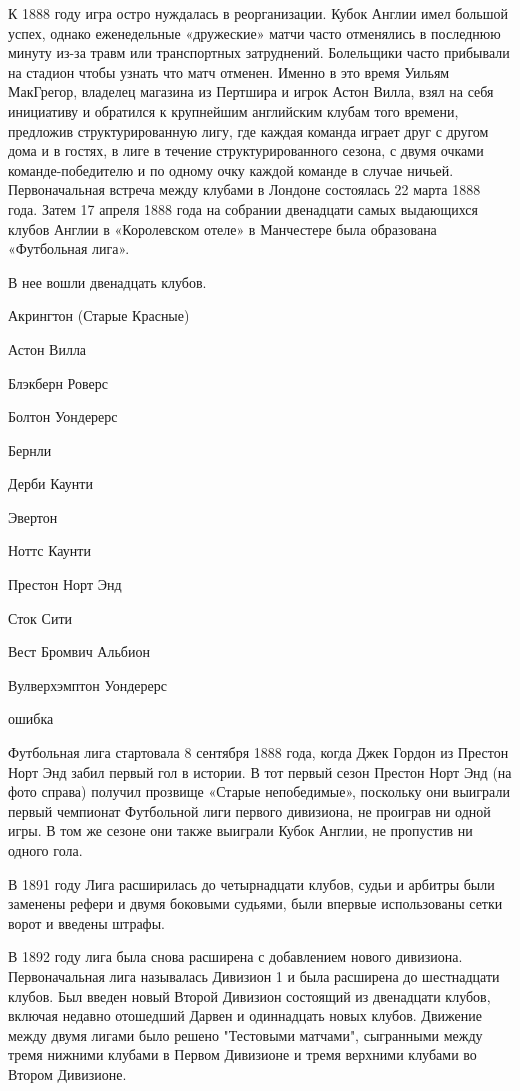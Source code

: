К 1888 году игра остро нуждалась в реорганизации. Кубок Англии имел большой успех, однако еженедельные «дружеские» матчи часто отменялись в последнюю минуту из-за травм или транспортных затруднений. Болельщики часто прибывали на стадион чтобы узнать что матч отменен. Именно в это время Уильям МакГрегор, владелец магазина из Пертшира и игрок Астон Вилла, взял на себя инициативу и обратился к крупнейшим английским клубам того времени, предложив структурированную лигу, где каждая команда играет друг с другом дома и в гостях, в лиге в течение структурированного сезона, с двумя очками команде-победителю и по одному очку каждой команде в случае ничьей. Первоначальная встреча между клубами в Лондоне состоялась 22 марта 1888 года. Затем 17 апреля 1888 года на собрании двенадцати самых выдающихся клубов Англии в «Королевском отеле» в Манчестере была образована «Футбольная лига».



В нее вошли двенадцать клубов.

Акрингтон (Старые Красные)

Астон Вилла

Блэкберн Роверс

Болтон Уондерерс

Бернли

Дерби Каунти 

Эвертон

Ноттс Каунти 

Престон Норт Энд

Сток Сити

Вест Бромвич Альбион

Вулверхэмптон Уондерерс





ошибка

Футбольная лига стартовала 8 сентября 1888 года, когда Джек Гордон из Престон Норт Энд забил первый гол в истории. В тот первый сезон Престон Норт Энд (на фото справа) получил прозвище «Старые непобедимые», поскольку они выиграли первый чемпионат Футбольной лиги первого дивизиона, не проиграв ни одной игры.  В том же сезоне они также выиграли Кубок Англии, не пропустив ни одного гола.

В 1891 году Лига расширилась до четырнадцати клубов, судьи и арбитры были заменены рефери и двумя боковыми судьями, были впервые использованы сетки ворот и введены штрафы.

В 1892 году лига была снова расширена с добавлением нового дивизиона. Первоначальная лига называлась Дивизион 1 и была расширена до шестнадцати клубов. Был введен новый Второй Дивизион состоящий из двенадцати клубов, включая недавно отошедший Дарвен и одиннадцать новых клубов. Движение между двумя лигами было решено "Тестовыми матчами", сыгранными между тремя нижними клубами в Первом Дивизионе и тремя верхними клубами во Втором Дивизионе.

